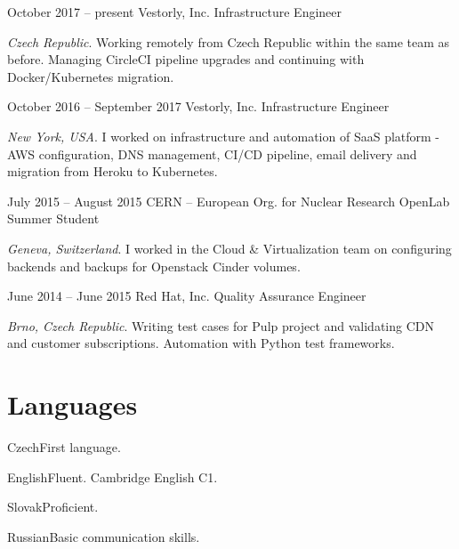 \documentclass{tccv}
\begin{document}
\begin{eventlist}

\item{October 2017 -- present}
{Vestorly, Inc.}
{Infrastructure Engineer}

\emph{Czech Republic}. Working remotely from Czech Republic within the same team as before. Managing CircleCI pipeline upgrades and continuing with Docker/Kubernetes migration.

\item{October 2016 -- September 2017}
{Vestorly, Inc.}
{Infrastructure Engineer}

\emph{New York, USA}. I worked on infrastructure and automation of SaaS platform - AWS configuration, DNS management, CI/CD pipeline, email delivery and migration from Heroku to Kubernetes.

\item{July 2015 -- August 2015}
     {CERN -- European Org. for Nuclear Research}
     {OpenLab Summer Student}

\emph{Geneva, Switzerland}. I worked in the Cloud \& Virtualization team on configuring backends and backups for Openstack Cinder volumes.


\item{June 2014 -- June 2015}
     {Red Hat, Inc.}
     {Quality Assurance Engineer}

\emph{Brno, Czech Republic}. Writing test cases for Pulp project and validating CDN and customer subscriptions. Automation with Python test frameworks.

%
%
%

\end{eventlist}

\section{Languages}

\begin{factlist}
	\item{Czech}{First language.}
	\item{English}{Fluent. Cambridge English C1.}
	\item{Slovak}{Proficient.}
	\item{Russian}{Basic communication skills.}
\end{factlist}
\end{document}
